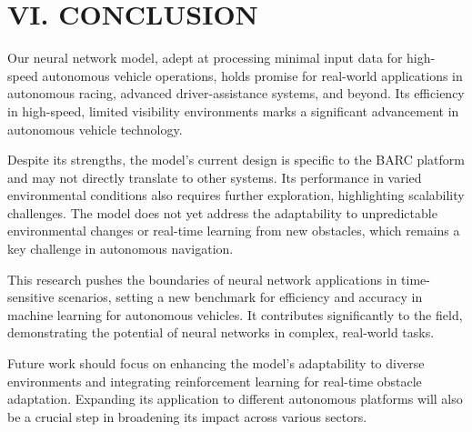 \documentclass[
	letterpaper, %
	10pt, %
	unnumberedsections, %
	twoside, %
]{LTJournalArticle}
\begin{document}
\section{VI. CONCLUSION}

\quad Our neural network model, adept at processing minimal input data for high-speed autonomous vehicle operations, holds promise for real-world applications in autonomous racing, advanced driver-assistance systems, and beyond. Its efficiency in high-speed, limited visibility environments marks a significant advancement in autonomous vehicle technology.

Despite its strengths, the model's current design is specific to the BARC platform and may not directly translate to other systems. Its performance in varied environmental conditions also requires further exploration, highlighting scalability challenges. The model does not yet address the adaptability to unpredictable environmental changes or real-time learning from new obstacles, which remains a key challenge in autonomous navigation.

This research pushes the boundaries of neural network applications in time-sensitive scenarios, setting a new benchmark for efficiency and accuracy in machine learning for autonomous vehicles. It contributes significantly to the field, demonstrating the potential of neural networks in complex, real-world tasks.

Future work should focus on enhancing the model's adaptability to diverse environments and integrating reinforcement learning for real-time obstacle adaptation. Expanding its application to different autonomous platforms will also be a crucial step in broadening its impact across various sectors.


\printbibliography %
\end{document}
